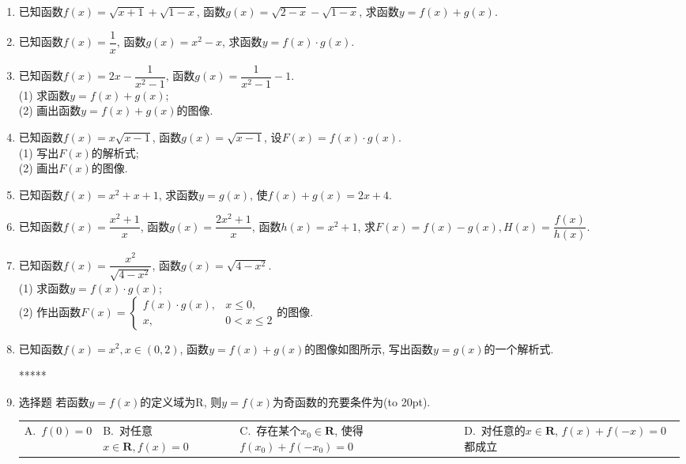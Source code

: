 \documentclass[10pt,a4paper]{article}
\newcommand{\bracket}[1]{(\hbox to #1pt{})}
\newcommand{\fourch}[4]{\par\begin{tabular}{p{.23\textwidth}p{.23\textwidth}p{.23\textwidth}p{.23\textwidth}}
A.~#1 &B.~#2& C.~#3& D.~#4
\end{tabular}}
\begin{document}
\begin{enumerate}[1.]
\begin{center}
\end{center}
\item 已知函数$f(x)=\sqrt {x+1}+\sqrt {1-x}$, 函数$g(x)=\sqrt {2-x}-\sqrt {1-x}$, 求函数$y=f(x)+g(x)$.
\item 已知函数$f(x)=\dfrac 1x$, 函数$g(x)=x^2-x$, 求函数$y=f(x)\cdot g(x)$.
\item 已知函数$f(x)=2x-\dfrac 1{x^2-1}$, 函数$g(x)=\dfrac 1{x^2-1}-1$.\\
(1) 求函数$y=f(x)+g(x)$;\\
(2) 画出函数$y=f(x)+g(x)$的图像.
\item 已知函数$f(x)=x\sqrt {x-1}$, 函数$g(x)=\sqrt {x-1}$, 设$F(x)=f(x)\cdot g(x)$.\\
(1) 写出$F(x)$的解析式;\\
(2) 画出$F(x)$的图像.
\item 已知函数$f(x)=x^2+x+1$, 求函数$y=g(x)$, 使$f(x)+g(x)=2x+4$.
\item 已知函数$f(x)=\dfrac{x^2+1}x$, 函数$g(x)=\dfrac{2x^2+1}x$, 函数$h(x)=x^2+1$, 求$F(x)=f(x)-g(x),H(x)=\dfrac{f(x)}{h(x)}$.
\item 已知函数$f(x)=\dfrac{x^2}{\sqrt {4-{x^2}}}$, 函数$g(x)=\sqrt {4-x^2}$.\\
(1) 求函数$y=f(x)\cdot g(x)$;\\
(2) 作出函数$F(x)=\begin{cases} f(x)\cdot g(x), & x\le 0, \\ x, & 0<x\le 2 \end{cases}$的图像.
\item 已知函数$f(x)=x^2,x\in (0,2)$, 函数$y=f(x)+g(x)$的图像如图所示, 写出函数$y=g(x)$的一个解析式.
\begin{center}
\end{center}
*****
\item 选择题
若函数$y=f(x)$的定义域为R, 则$y=f(x)$为奇函数的充要条件为\bracket{20}.
\fourch{$f(0)=0$}{对任意$x\in \mathbf{R},f(x)=0$}{存在某个$x_0\in \mathbf{R}$, 使得$f(x_0)+f(-x_0)=0$}{对任意的$x\in \mathbf{R}$, $f(x)+f(-x)=0$都成立}

\end{enumerate}
\end{document}
